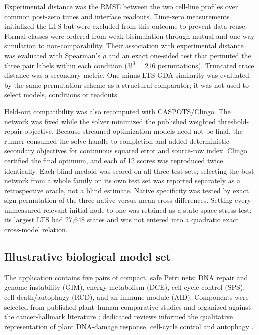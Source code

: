 \documentclass[JMCS,submit]{resources/ISRP}
\theoremstyle{definition}
\theoremstyle{remark}
\numberwithin{equation}{section}
\begin{document}
Experimental distance was the RMSE between the two cell-line profiles over
common post-zero times and interface readouts. Time-zero measurements initialized
the LTS but were excluded from this outcome to prevent data reuse. Formal classes were ordered from weak
bisimulation through mutual and one-way simulation to non-comparability. Their
association with experimental distance was evaluated with Spearman's $\rho$ and
an exact one-sided test that permuted the three pair labels within each condition
($3!^3=216$ permutations). Truncated trace distance was a secondary metric.
One minus LTS-GDA similarity was evaluated by the same permutation scheme as a
structural comparator; it was not used to select models, conditions or readouts.

Held-out compatibility was also recomputed with CASPOTS/Clingo. The network was
fixed while the solver minimized the published weighted threshold-repair
objective. Because streamed optimization models need not be final, the runner
consumed the solve handle to completion and added deterministic secondary
objectives for continuous squared error and source-row index. Clingo certified
the final optimum, and each of 12 scores was reproduced twice identically. Each
blind medoid was scored on all three test sets; selecting the best network from a
whole family on its own test set was reported separately as a retrospective
oracle, not a blind estimate. Native specificity was tested by exact sign
permutation of the three native-versus-mean-cross differences. Setting every
unmeasured relevant initial node to one was retained as a state-space stress test;
its largest LTS had 27,648 states and was not entered into a quadratic exact
cross-model relation.

\subsection{Illustrative biological model set}\label{sec:case-method}

The application contains five pairs of compact, safe Petri nets: DNA repair and
genome instability (GIM), energy metabolism (DCE), cell-cycle control (SPS), cell
death/autophagy (RCD), and an immune module (AID). Components were selected from
published plant--human comparative studies \cite{Quimbaya2012,
ClavijoBuritica2023} and organized against the cancer-hallmark literature
\cite{Hanahan2011,Hanahan2022}; dedicated reviews informed the qualitative
representation of plant DNA-damage response, cell-cycle control and autophagy
\cite{Yoshiyama2013,DeVeylder2007,Marshall2018}.
\end{document}
